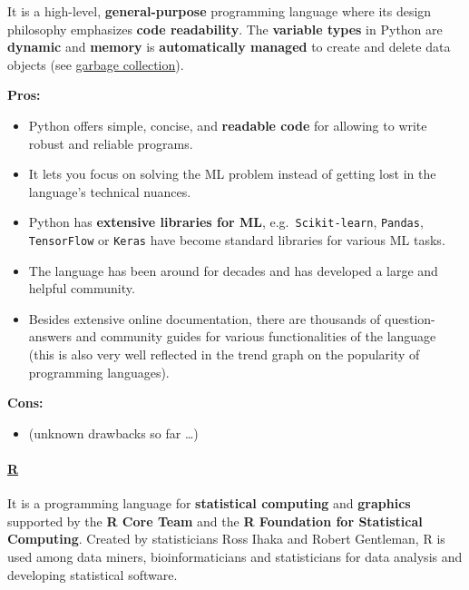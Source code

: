 \documentclass [oneside,10pt,a4paper,ngerman,BCOR10mm,headsepline,parindent,final]{scrartcl}
\providecommand{\tightlist}{%
      \setlength{\itemsep}{0pt}\setlength{\parskip}{0pt}}
\begin{document}
It is a high-level, \textbf{general-purpose} programming language where
its design philosophy emphasizes \textbf{code readability}. The
\textbf{variable types} in Python are \textbf{dynamic} and
\textbf{memory} is \textbf{automatically managed} to create and delete
data objects (see
\href{https://en.wikipedia.org/wiki/Garbage_collection_(computer_science)}{garbage
collection}).

\textbf{Pros:}

\begin{itemize}
\tightlist
\item
  Python offers simple, concise, and \textbf{readable code} for allowing
  to write robust and reliable programs.
\item
  It lets you focus on solving the ML problem instead of getting lost in
  the language's technical nuances.
\item
  Python has \textbf{extensive libraries for ML},
  e.g.~\texttt{Scikit-learn}, \texttt{Pandas}, \texttt{TensorFlow} or
  \texttt{Keras} have become standard libraries for various ML tasks.
\item
  The language has been around for decades and has developed a large and
  helpful community.
\item
  Besides extensive online documentation, there are thousands of
  question-answers and community guides for various functionalities of
  the language (this is also very well reflected in the trend graph on
  the popularity of programming languages).
\end{itemize}

\textbf{Cons:}

\begin{itemize}
\tightlist
\item
  (unknown drawbacks so far \ldots)
\end{itemize}

    \hypertarget{r}{%
\paragraph{\texorpdfstring{\href{https://en.wikipedia.org/wiki/R_(programming_language)}{R}}{R}}\label{r}}

It is a programming language for \textbf{statistical computing} and
\textbf{graphics} supported by the \textbf{R Core Team} and the
\textbf{R Foundation for Statistical Computing}. Created by
statisticians Ross Ihaka and Robert Gentleman, R is used among data
miners, bioinformaticians and statisticians for data analysis and
developing statistical software.
\end{document}
